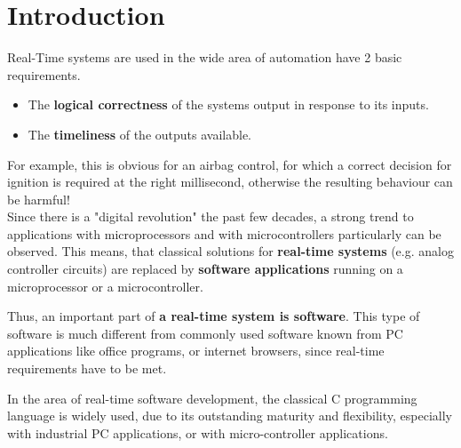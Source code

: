 
\section{Introduction}

Real-Time systems are used in the wide area of automation have 2 basic requirements.

\begin{itemize}
	\item  The \textbf{logical correctness} of the systems output in response to its inputs.
	\item  The \textbf{timeliness} of the outputs available.
\end{itemize}

For example, this is obvious for an airbag control, for which a correct decision for ignition is required at the right millisecond, otherwise the resulting behaviour can be harmful!\\

Since there is a "digital revolution" the past few decades, a strong trend to applications with microprocessors and with microcontrollers particularly can be observed. This means, that classical solutions for \textbf{real-time systems} (e.g. analog controller circuits) are replaced by \textbf{software applications} running on a microprocessor or a microcontroller.\\

\os{\newpage}

Thus, an important part of \textbf{a real-time system is software}. This type of software is much different from commonly used software known from PC applications like office programs, or internet browsers, since real-time requirements have to be met.

In the area of real-time software development, the classical C programming language is widely used, due to its outstanding maturity and flexibility, especially with industrial PC applications, or with micro-controller applications. 


